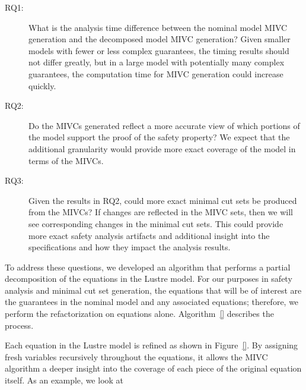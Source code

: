 \begin{description}
\item [RQ1:] What is the analysis time difference between the nominal model MIVC generation and the decomposed model MIVC generation? Given smaller models with fewer or less complex guarantees, the timing results should not differ greatly, but in a large model with potentially many complex guarantees, the computation time for MIVC generation could increase quickly. 

\item[RQ2:] Do the MIVCs generated reflect a more accurate view of which portions of the model support the proof of the safety property? We expect that the additional granularity would provide more exact coverage of the model in terms of the MIVCs. 

\item[RQ3:] Given the results in RQ2, could more exact minimal cut sets be produced from the MIVCs? If changes are reflected in the MIVC sets, then we will see corresponding changes in the minimal cut sets. This could provide more exact safety analysis artifacts and additional insight into the specifications and how they impact the analysis results. 
\end{description}

To address these questions, we developed an algorithm that performs a partial decomposition of the equations in the Lustre model. For our purposes in safety analysis and minimal cut set generation, the equations that will be of interest are the guarantees in the nominal model and any associated equations; therefore, we perform the refactorization on equations alone. Algorithm~\ref{} describes the process. 

Each equation in the Lustre model is refined as shown in Figure~\ref{}.  By assigning fresh variables recursively throughout the equations, it allows the MIVC algorithm a deeper insight into the coverage of each piece of the original equation itself. As an example, we look at \danielle{}


